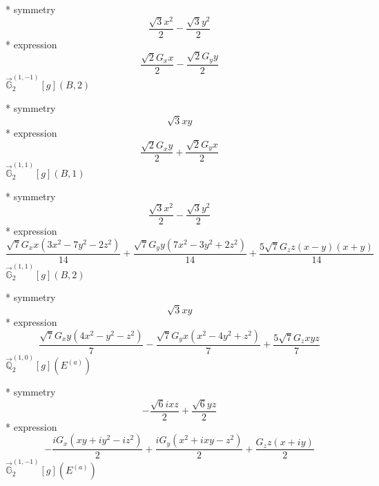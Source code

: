 \documentclass[fleqn,8pt]{jsarticle}
\begin{document}
\noindent\quad ** symmetry
\begin{dmath*}
\frac{\sqrt{3} x^{2}}{2} - \frac{\sqrt{3} y^{2}}{2}
\end{dmath*}
\noindent\quad ** expression
\begin{dmath*}
\frac{\sqrt{2} G_{x} x}{2} - \frac{\sqrt{2} G_{y} y}{2}
\end{dmath*}
\noindent\quad $\vec{\mathbb{G}}_{2}^{(1,-1)}[g](B,2)$

\noindent\quad ** symmetry
\begin{dmath*}
\sqrt{3} x y
\end{dmath*}
\noindent\quad ** expression
\begin{dmath*}
\frac{\sqrt{2} G_{x} y}{2} + \frac{\sqrt{2} G_{y} x}{2}
\end{dmath*}
\noindent\quad $\vec{\mathbb{G}}_{2}^{(1,1)}[g](B,1)$

\noindent\quad ** symmetry
\begin{dmath*}
\frac{\sqrt{3} x^{2}}{2} - \frac{\sqrt{3} y^{2}}{2}
\end{dmath*}
\noindent\quad ** expression
\begin{dmath*}
\frac{\sqrt{7} G_{x} x \left(3 x^{2} - 7 y^{2} - 2 z^{2}\right)}{14} + \frac{\sqrt{7} G_{y} y \left(7 x^{2} - 3 y^{2} + 2 z^{2}\right)}{14} + \frac{5 \sqrt{7} G_{z} z \left(x - y\right) \left(x + y\right)}{14}
\end{dmath*}
\noindent\quad $\vec{\mathbb{G}}_{2}^{(1,1)}[g](B,2)$

\noindent\quad ** symmetry
\begin{dmath*}
\sqrt{3} x y
\end{dmath*}
\noindent\quad ** expression
\begin{dmath*}
\frac{\sqrt{7} G_{x} y \left(4 x^{2} - y^{2} - z^{2}\right)}{7} - \frac{\sqrt{7} G_{y} x \left(x^{2} - 4 y^{2} + z^{2}\right)}{7} + \frac{5 \sqrt{7} G_{z} x y z}{7}
\end{dmath*}
\noindent\quad $\vec{\mathbb{Q}}_{2}^{(1,0)}[g](E^{(a)})$

\noindent\quad ** symmetry
\begin{dmath*}
- \frac{\sqrt{6} i x z}{2} + \frac{\sqrt{6} y z}{2}
\end{dmath*}
\noindent\quad ** expression
\begin{dmath*}
- \frac{i G_{x} \left(x y + i y^{2} - i z^{2}\right)}{2} + \frac{i G_{y} \left(x^{2} + i x y - z^{2}\right)}{2} + \frac{G_{z} z \left(x + i y\right)}{2}
\end{dmath*}
\noindent\quad $\vec{\mathbb{G}}_{2}^{(1,-1)}[g](E^{(a)})$
\end{document}
